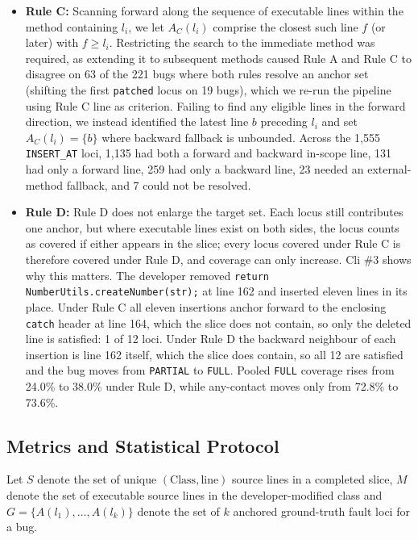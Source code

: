 \documentclass[sigconf,nonacm]{acmart}
\begin{document}
\begin{itemize}
    \item \textbf{Rule C:} Scanning forward along the sequence of executable lines within the method containing $l_i$, we let $A_C(l_i)$ comprise the closest such line $f$ (or later) with $f \ge l_i$. Restricting the search to the immediate method was required, as extending it to subsequent methods caused Rule A and Rule C to disagree on 63 of the 221 bugs where both rules resolve an anchor set (shifting the first \texttt{patched} locus on 19 bugs), which we re-run the pipeline using Rule C line as criterion. Failing to find any eligible lines in the forward direction, we instead identified the latest line $b$ preceding $l_i$ and set $A_C(l_i)=\{b\}$ where backward fallback is unbounded. Across the 1,555 \texttt{INSERT\_AT} loci, 1,135 had both a forward and backward in-scope line, 131 had only a forward line, 259 had only a backward line, 23 needed an external-method fallback, and 7 could not be resolved.
    \item \textbf{Rule D:} Rule D does not enlarge the target set. Each locus still contributes one anchor, but where executable lines exist on both sides, the locus counts as covered if either appears in the slice; every locus covered under Rule C is therefore covered under Rule D, and coverage can only increase. Cli \#3 shows why this matters. The developer removed \newline
    \texttt{return NumberUtils.createNumber(str);} at line 162 and inserted eleven lines in its place. Under Rule C all eleven insertions anchor forward to the enclosing \texttt{catch} header at line 164, which the slice does not contain, so only the deleted line is satisfied: 1 of 12 loci. Under Rule D the backward neighbour of each insertion is line 162 itself, which the slice does contain, so all 12 are satisfied and the bug moves from \texttt{PARTIAL} to \texttt{FULL}. Pooled \texttt{FULL} coverage rises from 24.0\% to 38.0\% under Rule D, while any-contact moves only from 72.8\% to 73.6\%.
\end{itemize}

\subsection{Metrics and Statistical Protocol}

Let $S$ denote the set of unique $(\text{Class}, \text{line})$ source lines in a completed slice, $M$ denote the set of executable source lines in the developer-modified class and $G = \{A(l_1), \dots, A(l_k)\}$ denote the set of $k$ anchored ground-truth fault loci for a bug.
\end{document}
